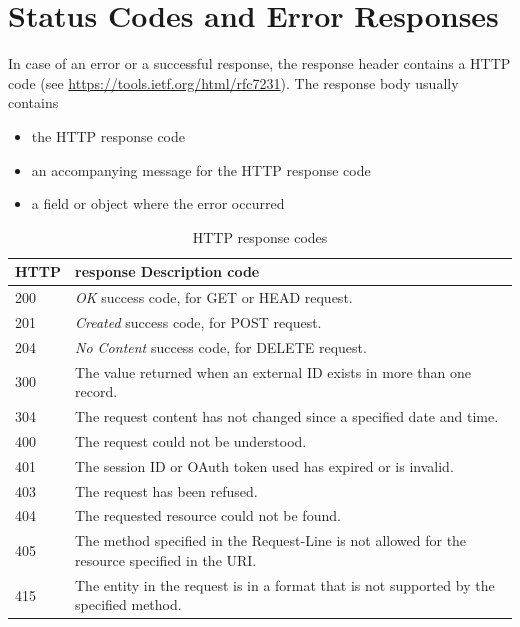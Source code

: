 \documentclass[10pt]{article}
\begin{document}

%

\section{Status Codes and Error Responses}

In case of an error or a successful response, the response header
contains a HTTP code (see
\url{https://tools.ietf.org/html/rfc7231}). The response body usually
contains

\begin{itemize}
\item the HTTP response code
\item an accompanying message for the HTTP response code
\item a field or object where the error occurred 
\end{itemize}

\begin{table}[!h]
\caption{HTTP response codes}
\begin{tabular}{p{1cm}p{15cm}}
HTTP & response Description code \\
\hline
200 & {\it OK} success code, for GET or HEAD request. \\
201 & {\it Created} success code, for POST request. \\
204 & {\it No Content} success code, for DELETE request. \\
300 & The value returned when an external ID exists in more than one
      record. \\
304 & The request content has not changed since a specified date and
      time. \\
400 & The request could not be understood. \\
401 & The session ID or OAuth token used has expired or is invalid. \\
403 & The request has been refused. \\
404 & The requested resource could not be found. \\
405 & The method specified in the Request-Line is not allowed for the
      resource specified in the URI. \\
415 & The entity in the request is in a format that is not supported by
      the specified method. \\
\end{tabular}
\end{table}
\end{document}
